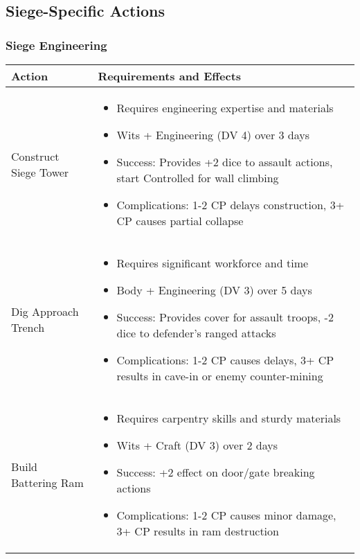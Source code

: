 \subsection{Siege-Specific Actions}

\subsubsection{Siege Engineering}

\begin{longtable}{|>{\raggedright\arraybackslash}p{4cm}|>{\raggedright\arraybackslash}p{8cm}|}
\hline
\textbf{Action} & \textbf{Requirements and Effects} \\
\hline
Construct Siege Tower & 
\begin{itemize}
    \item Requires engineering expertise and materials
    \item Wits + Engineering (DV 4) over 3 days
    \item Success: Provides +2 dice to assault actions, start Controlled for wall climbing
    \item Complications: 1-2 CP delays construction, 3+ CP causes partial collapse
\end{itemize} \\
\hline
Dig Approach Trench & 
\begin{itemize}
    \item Requires significant workforce and time
    \item Body + Engineering (DV 3) over 5 days
    \item Success: Provides cover for assault troops, -2 dice to defender's ranged attacks
    \item Complications: 1-2 CP causes delays, 3+ CP results in cave-in or enemy counter-mining
\end{itemize} \\
\hline
Build Battering Ram & 
\begin{itemize}
    \item Requires carpentry skills and sturdy materials
    \item Wits + Craft (DV 3) over 2 days
    \item Success: +2 effect on door/gate breaking actions
    \item Complications: 1-2 CP causes minor damage, 3+ CP results in ram destruction
\end{itemize} \\
\hline
\end{longtable}

